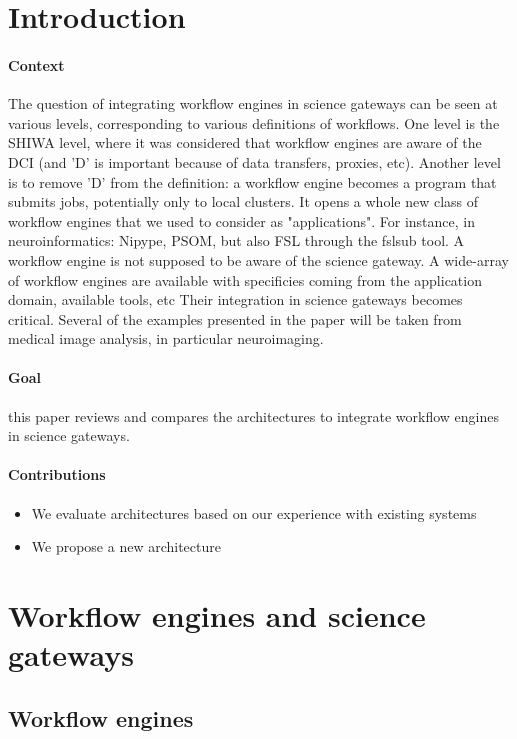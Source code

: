 \documentclass[preprint,3p,twocolumn]{elsarticle}
\begin{document}
\section{Introduction}

\paragraph{Context} The question of integrating workflow engines in
science gateways can be seen at various levels, corresponding to
various definitions of workflows. One level is the SHIWA level, where
it was considered that workflow engines are aware of the DCI (and 'D'
is important because of data transfers, proxies, etc). Another level
is to remove 'D' from the definition: a workflow engine becomes a
program that submits jobs, potentially only to local clusters. It
opens a whole new class of workflow engines that we used to consider
as "applications". For instance, in neuroinformatics: Nipype, PSOM,
but also FSL through the fslsub tool. A workflow engine is not
supposed to be aware of the science gateway.  A wide-array of workflow
engines are available with specificies coming from the application
domain, available tools, etc Their integration in science gateways
becomes critical. Several of the examples presented in the
paper will be taken from medical image analysis, in particular
neuroimaging.

\paragraph{Goal} this paper reviews and compares the architectures to
integrate workflow engines in science gateways.

\paragraph{Contributions}
\begin{itemize}
\item We evaluate architectures based on our experience with existing systems
\item We propose a new architecture
\end{itemize}

\section{Workflow engines and science gateways}

\subsection{Workflow engines}
\end{document}

